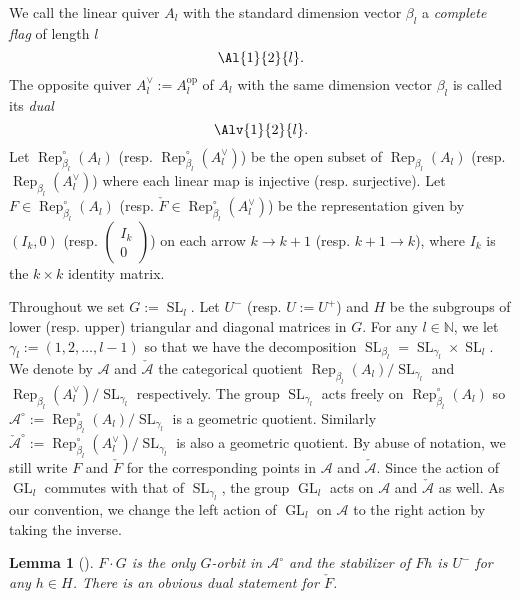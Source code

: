 \documentclass{amsart}
\newtheorem{lemma}[theorem]{Lemma}
\theoremstyle{definition}
\theoremstyle{remark}
\numberwithin{equation}{section}
\DeclareMathOperator{\GL}{GL}
\DeclareMathOperator{\Rep}{Rep}
\DeclareMathOperator{\SL}{SL}
\newcommand{\opp}{{\operatorname{op}}}
\newcommand{\mc}[1]{\mathcal{#1}}
\newcommand{\mb}[1]{\mathbb{#1}}
\newcommand{\mch}[1]{\check{\mathcal{#1}}}
\newcommand{\sm}[1]{{\left(\begin{smallmatrix}#1\end{smallmatrix}\right)}}
\newcommand{\bl}{{\beta_l}}
\begin{document}
We call the linear quiver $A_l$ with the standard dimension vector $\bl$ a {\em complete flag} of length $l$
$$\Al{1}{2}{l}.$$  
The opposite quiver $A_l^\vee:=A_l^{\opp}$ of $A_l$ with the same dimension vector $\bl$ is called its {\em dual}
$$\Alv{1}{2}{l}.$$  
Let $\Rep_\bl^\circ(A_l)$ (resp. $\Rep_{\bl}^\circ(A_l^\vee)$) be the open subset of $\Rep_\bl(A_l)$ (resp. $\Rep_{\bl}(A_l^\vee)$) where each linear map is injective (resp. surjective).
Let $F\in \Rep_\bl^\circ(A_l)$ (resp. $\check{F}\in \Rep_{\bl}^\circ(A_l^\vee)$) be the representation given by $(I_k,0)$ (resp. $\sm{I_k \\ 0}$) on each arrow $k\to k+1$ (resp. $k+1\to k$), where $I_k$ is the $k\times k$ identity matrix. 

Throughout we set $G:=\SL_l$. Let $U^-$ (resp. $U:=U^+$) and $H$ be the subgroups of lower (resp. upper) triangular and diagonal matrices in $G$. 
For any $l\in\mb{N}$, we let $\gamma_l:=(1,2,\dots,l-1)$ so that we have the decomposition $\SL_{\bl}=\SL_{\gamma_{l}} \times \SL_l$.
We denote by $\mc{A}$ and $\mch{A}$ the categorical quotient $\Rep_\bl(A_l)/\SL_{\gamma_{l}}$ and $\Rep_\bl(A_l^\vee)/\SL_{\gamma_{l}}$ respectively.
The group $\SL_{\gamma_{l}}$ acts freely on $\Rep_\bl^\circ(A_l)$ so $\mc{A}^\circ:=\Rep_\bl^\circ(A_l)/\SL_{\gamma_{l}}$ is a geometric quotient. 
Similarly $\mch{A}^\circ:=\Rep_\bl^\circ(A_l^\vee)/\SL_{\gamma_{l}}$ is also a geometric quotient.
By abuse of notation, we still write $F$ and $\check{F}$ for the corresponding points in $\mc{A}$ and $\mch{A}$. 
Since the action of $\GL_l$ commutes with that of $\SL_{\gamma_{l}}$, the group $\GL_l$ acts on $\mc{A}$ and $\mch{A}$ as well.
As our convention, we change the left action of $\GL_l$ on $\mc{A}$ to the right action by taking the inverse.


\begin{lemma}[{\cite[Lemma 4.5]{FW}}] \label{L:stabilizer}  $F\cdot G$ is the only $G$-orbit in $\mc{A}^\circ$ and the stabilizer of $Fh$ is $U^-$ for any $h\in H$.
There is an obvious dual statement for $\check{F}$.
\end{lemma}
\end{document}
